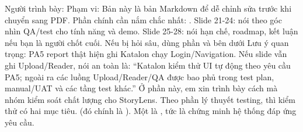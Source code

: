 \markdownRendererDocumentBegin
\markdownRendererNbsp{}\markdownRendererInterblockSeparator
{}\markdownRendererSectionBegin
{}\markdownRendererInterblockSeparator
{}Người trình bày: \markdownRendererSoftLineBreak
{}Phạm vi: \markdownRendererSoftLineBreak
{}Bản này là bản Markdown để dễ chỉnh sửa trước khi chuyển sang PDF.\markdownRendererInterblockSeparator
{}\markdownRendererSectionBegin
{}\markdownRendererInterblockSeparator
{}\markdownRendererUlBeginTight
\markdownRendererUlItem Phần chính cần nắm chắc nhất: .\markdownRendererUlItemEnd 
\markdownRendererUlItem Slide 21-24: nói theo góc nhìn QA/test cho tính năng và demo.\markdownRendererUlItemEnd 
\markdownRendererUlItem Slide 25-28: nói hạn chế, roadmap, kết luận nếu bạn là người chốt cuối.\markdownRendererUlItemEnd 
\markdownRendererUlItem Nếu bị hỏi sâu, dùng phần  và  bên dưới\markdownRendererUlItemEnd 
\markdownRendererUlItem Lưu ý quan trọng: PA5 report thật hiện ghi Katalon chạy Login/Navigation. Nếu slide vẫn ghi Upload/Reader, nói an toàn là:\markdownRendererSoftLineBreak
{}“Katalon kiểm thử UI tự động theo yêu cầu PA5; ngoài ra các luồng Upload/Reader/Q\markdownRendererAmpersand{}A được bao phủ trong test plan, manual/UAT và các tầng test khác.”\markdownRendererUlItemEnd 
\markdownRendererUlEndTight \markdownRendererInterblockSeparator
{}\markdownRendererThematicBreak{}\markdownRendererInterblockSeparator
{}
\markdownRendererSectionEnd 
\markdownRendererSectionEnd \markdownRendererSectionBegin
{}\markdownRendererInterblockSeparator
{}\markdownRendererSectionBegin
{}\markdownRendererInterblockSeparator
{}Ở phần này, em xin trình bày cách mà nhóm kiểm soát chất lượng cho StoryLens.\markdownRendererParagraphSeparator
{}Theo phần lý thuyết testing, thì kiểm thử có hai mục tiêu. (đó chính là ).\markdownRendererInterblockSeparator
{}\markdownRendererUlBeginTight
\markdownRendererUlItem Một là , tức là chứng minh hệ thống đáp ứng yêu cầu.\markdownRendererUlItemEnd 
